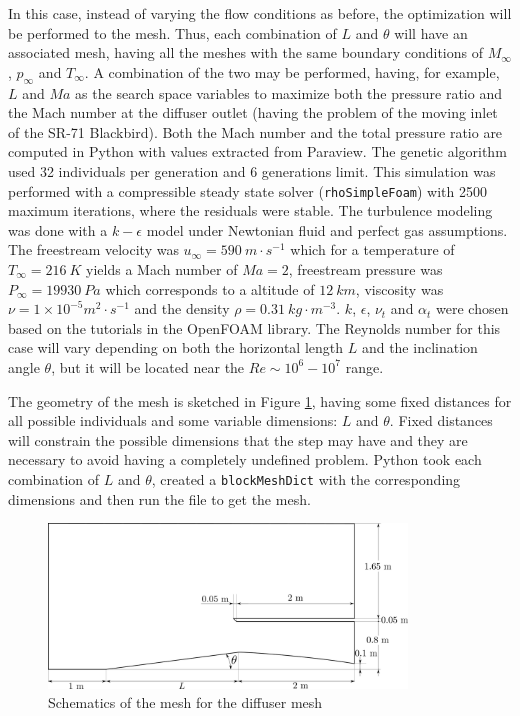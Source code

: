 In this case, instead of varying the flow conditions as before, the optimization will be performed to the mesh. Thus, each combination of $L$ and $\theta$ will have an associated mesh, having all the meshes with the same boundary conditions of $M_\infty$, $p_\infty$ and $T_\infty$. A combination of the two may be performed, having, for example, $L$ and $Ma$ as the search space variables to maximize both the pressure ratio and the Mach number at the diffuser outlet (having the problem of the moving inlet of the SR-71 Blackbird).  Both the Mach number and the total pressure ratio are computed in Python with values extracted from Paraview. The genetic algorithm used 32 individuals per generation and 6 generations limit. This simulation was performed with a compressible steady state solver (\texttt{rhoSimpleFoam}) with 2500 maximum iterations, where the residuals were stable. The turbulence modeling was done with a $k-\epsilon$ model under Newtonian fluid and perfect gas assumptions. The freestream velocity was $u_\infty = 590\ m\cdot s^{-1}$ which for a temperature of $T_\infty=216\ K$ yields a Mach number of $Ma=2$, freestream pressure was $P_\infty=19930\ Pa$ which corresponds to a altitude of $12\ km$, viscosity was $\nu=1\times 10^{-5} m^2 \cdot s^{-1}$ and the density $\rho=0.31\ kg \cdot m^{-3}$. $k$, $\epsilon$, $\nu_t$ and $\alpha_t$ were chosen based on the tutorials in the OpenFOAM library. The Reynolds number for this case will vary depending on both the horizontal length $L$ and the inclination angle $\theta$, but it will be located near the $Re \sim 10^6-10^7$ range.

\newpage

The geometry of the mesh is sketched in Figure \ref{fig:diffuserMesh}, having some fixed distances for all possible individuals and some variable dimensions: $L$ and $\theta$. Fixed distances will constrain the possible dimensions that the step may have and they are necessary to avoid having a completely undefined problem. Python took each combination of $L$ and $\theta$, created a \texttt{blockMeshDict} with the corresponding dimensions and then run the file to get the mesh. 

     \begin{figure}[h!]
        \centering
        \includegraphics[width=0.85\textwidth]{Figures/3/diffuserMesh.png}
        \caption{Schematics of the mesh for the diffuser mesh}
        \label{fig:diffuserMesh}
    \end{figure}

